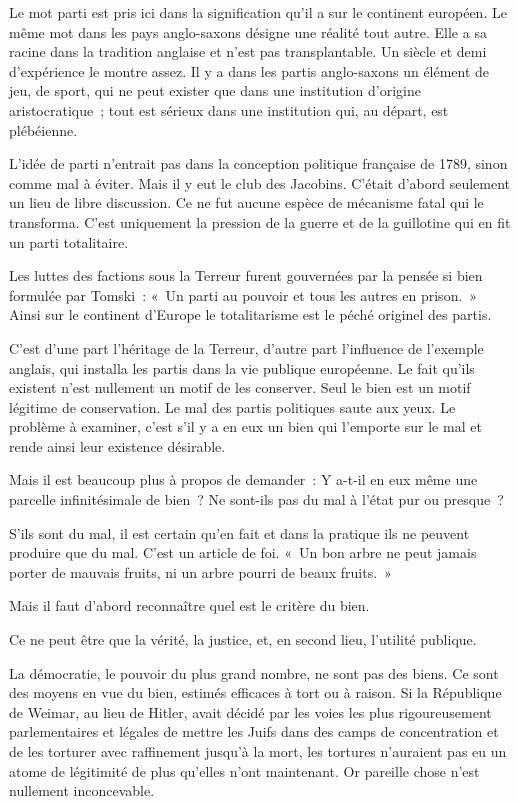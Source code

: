 \documentclass[french,twoside]{book} %
\begin{document}
  \noindent Le mot parti est pris ici dans la signification qu’il a sur le continent européen. Le même mot dans les pays anglo-saxons désigne une réalité tout autre. Elle a sa racine dans la tradition anglaise et n’est pas transplantable. Un siècle et demi d’expérience le montre assez. Il y a dans les partis anglo-saxons un élément de jeu, de sport, qui ne peut exister que dans une institution d’origine aristocratique ; tout est sérieux dans une institution qui, au départ, est plébéienne.\par
L’idée de parti n’entrait pas dans la conception politique française de 1789, sinon comme mal à éviter. Mais il y eut le club des Jacobins. C’était d’abord seulement un lieu de libre discussion. Ce ne fut aucune espèce de mécanisme fatal qui le transforma. C’est uniquement la pression de la guerre et de la guillotine qui en fit un parti totalitaire.\par
Les luttes des factions sous la Terreur furent gouvernées par la pensée si bien formulée par Tomski : « Un parti au pouvoir et tous les autres en prison. » Ainsi sur le continent d’Europe le totalitarisme est le péché originel des partis.\par
C’est d’une part l’héritage de la Terreur, d’autre part l’influence de l’exemple anglais, qui installa les partis dans la vie publique européenne. Le fait qu’ils existent n’est nullement un motif de les conserver. Seul le bien est un motif légitime de conservation. Le mal des partis politiques saute aux yeux. Le problème à examiner, c’est s’il y a en eux un bien qui l’emporte sur le mal et rende ainsi leur existence désirable.\par
Mais il est beaucoup plus à propos de demander : Y a-t-il en eux même une parcelle infinitésimale de bien ? Ne sont-ils pas du mal à l’état pur ou presque ?\par
S’ils sont du mal, il est certain qu’en fait et dans la pratique ils ne peuvent produire que du mal. C’est un article de foi. « Un bon arbre ne peut jamais porter de mauvais fruits, ni un arbre pourri de beaux fruits. »\par
Mais il faut d’abord reconnaître quel est le critère du bien.\par
Ce ne peut être que la vérité, la justice, et, en second lieu, l’utilité publique.\par
La démocratie, le pouvoir du plus grand nombre, ne sont pas des biens. Ce sont des moyens en vue du bien, estimés efficaces à tort ou à raison. Si la République de Weimar, au lieu de Hitler, avait décidé par les voies les plus rigoureusement parlementaires et légales de mettre les Juifs dans des camps de concentration et de les torturer avec raffinement jusqu’à la mort, les tortures n’auraient pas eu un atome de légitimité de plus qu’elles n’ont maintenant. Or pareille chose n’est nullement inconcevable.\par
\end{document}
